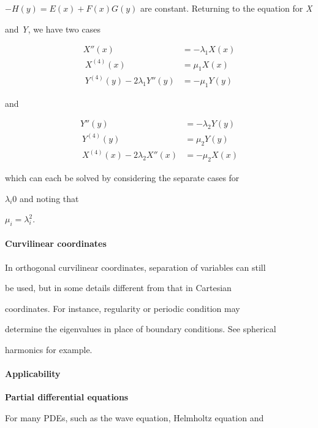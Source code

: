 $-H(y)=E(x)+F(x)G(y)$ are constant. Returning to the equation for \textit{X}

and \textit{Y}, we have two cases



\begin{align}
    X''(x) &= -\lambda_1X(x) \\\    X^{(4)}(x) &= \mu_1X(x) \\\    Y^{(4)}(y) - 2\lambda_1Y''(y) &= -\mu_1Y(y)
\end{align}



and



\begin{align}
    Y''(y) &= -\lambda_2Y(y) \\\    Y^{(4)}(y) &= \mu_2Y(y) \\\    X^{(4)}(x) - 2\lambda_2X''(x) &= -\mu_2X(x)
\end{align}



which can each be solved by considering the separate cases for

$\lambda_i0$ and noting that

$\mu_i=\lambda_i^2$.



\paragraph{Curvilinear coordinates}



In orthogonal curvilinear coordinates, separation of variables can still

be used, but in some details different from that in Cartesian

coordinates. For instance, regularity or periodic condition may

determine the eigenvalues in place of boundary conditions. See spherical

harmonics for example.



\paragraph{Applicability}



\textbf{Partial differential equations}



For many PDEs, such as the wave equation, Helmholtz equation and

